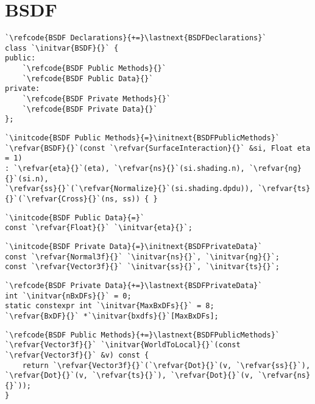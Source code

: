 \section{BSDF}\label{sec:BSDF}

\begin{lstlisting}
`\refcode{BSDF Declarations}{+=}\lastnext{BSDFDeclarations}`
class `\initvar{BSDF}{}` {
public:
    `\refcode{BSDF Public Methods}{}`
    `\refcode{BSDF Public Data}{}`
private:
    `\refcode{BSDF Private Methods}{}`
    `\refcode{BSDF Private Data}{}`
};
\end{lstlisting}

\begin{lstlisting}
`\initcode{BSDF Public Methods}{=}\initnext{BSDFPublicMethods}`
`\refvar{BSDF}{}`(const `\refvar{SurfaceInteraction}{}` &si, Float eta = 1)
: `\refvar{eta}{}`(eta), `\refvar{ns}{}`(si.shading.n), `\refvar{ng}{}`(si.n),
`\refvar{ss}{}`(`\refvar{Normalize}{}`(si.shading.dpdu)), `\refvar{ts}{}`(`\refvar{Cross}{}`(ns, ss)) { }
\end{lstlisting}

\begin{lstlisting}
`\initcode{BSDF Public Data}{=}`
const `\refvar{Float}{}` `\initvar{eta}{}`;
\end{lstlisting}

\begin{lstlisting}
`\initcode{BSDF Private Data}{=}\initnext{BSDFPrivateData}`
const `\refvar{Normal3f}{}` `\initvar{ns}{}`, `\initvar{ng}{}`;
const `\refvar{Vector3f}{}` `\initvar{ss}{}`, `\initvar{ts}{}`;
\end{lstlisting}

\begin{lstlisting}
`\refcode{BSDF Private Data}{+=}\lastnext{BSDFPrivateData}`
int `\initvar{nBxDFs}{}` = 0;
static constexpr int `\initvar{MaxBxDFs}{}` = 8;
`\refvar{BxDF}{}` *`\initvar{bxdfs}{}`[MaxBxDFs];
\end{lstlisting}

\begin{lstlisting}
`\refcode{BSDF Public Methods}{+=}\lastnext{BSDFPublicMethods}`
`\refvar{Vector3f}{}` `\initvar{WorldToLocal}{}`(const `\refvar{Vector3f}{}` &v) const {
    return `\refvar{Vector3f}{}`(`\refvar{Dot}{}`(v, `\refvar{ss}{}`), `\refvar{Dot}{}`(v, `\refvar{ts}{}`), `\refvar{Dot}{}`(v, `\refvar{ns}{}`));
}
\end{lstlisting}

